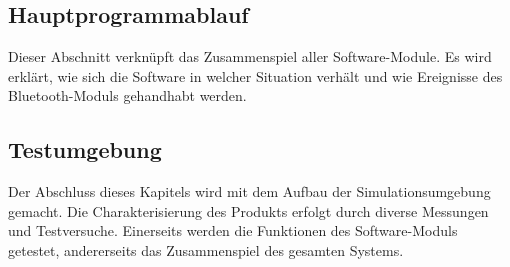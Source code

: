\subsection{Hauptprogrammablauf}
Dieser Abschnitt verknüpft das Zusammenspiel aller Software-Module.
Es wird erklärt, wie sich die Software in welcher Situation verhält und wie Ereignisse des Bluetooth-Moduls gehandhabt werden.

\subsection{Testumgebung}
Der Abschluss dieses Kapitels wird mit dem Aufbau der Simulationsumgebung gemacht. Die Charakterisierung des Produkts erfolgt durch diverse Messungen und Testversuche. Einerseits werden die Funktionen des Software-Moduls getestet, andererseits das Zusammenspiel des gesamten Systems.